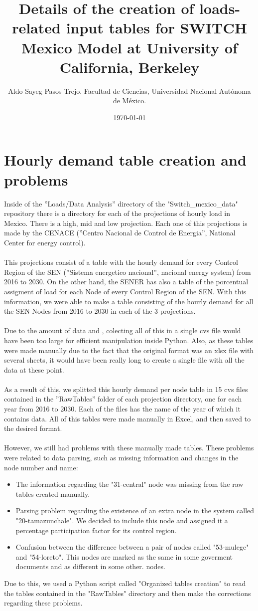 \documentclass{article}
\author{Aldo Sayeg Pasos Trejo. Facultad de Ciencias, Universidad Nacional Autónoma de México.}
\date{\today}
\title{Details of the creation of loads-related input tables for SWITCH Mexico Model at University of California, Berkeley}
\begin{document}
\maketitle
\section{Hourly demand table creation and problems}
Inside of the ''Loads/Data Analysis'' directory of the "Switch\_mexico\_data" repository there is a directory for each of the projections of hourly load in Mexico. There is a high, mid and low projection. Each one of this projections is made by the CENACE (''Centro Nacional de Control de Energia'', National Center for energy control). 
\\
\\This projections consist of a table with the hourly demand for every Control Region of the SEN (''Sistema energetico nacional'', nacional energy system) from 2016 to 2030. On the other hand, the SENER has also a table of the porcentual assigment of load for each Node of every Control Region of the SEN. With this information, we were able to make a table consisting of the hourly demand for all the SEN Nodes from 2016 to 2030 in each of the 3 projections. 
\\
\\Due to the amount of data and , colecting all of this in a single cvs file would have been too large for efficient manipulation inside Python. Also, as these tables were made manually due to the fact that the original format was an xlsx file with several sheets, it would have been really long to create a single file with all the data at these point. 
\\
\\As a result of this, we splitted this hourly demand per node table in 15 cvs files contained in the ''RawTables'' folder of each projection directory, one for each year from 2016 to 2030. Each of the files has the name of the year of which it contains data. All of this tables were made manually in Excel, and then saved to the desired format.
\\
\\However, we still had problems with these manually made tables. These problems were related to data parsing, such as missing information and changes in the node number and name:
\begin{itemize}
\item The information regarding the "31-central" node was missing from the raw tables created manually.
\item Parsing problem regarding the existence of an extra node in the system called "20-tamazunchale". We decided to include this node and assigned it a percentage participation factor for its control region.
\item Confusion between the difference between a pair of nodes called "53-mulege" and "54-loreto". This nodes are marked as the same in some goverment documents and as different in some other.  nodes.
\end{itemize}
Due to this, we used a Python script called "Organized tables creation" to read the tables contained in the "RawTables" directory and then make the corrections regarding these problems.
\end{document}
